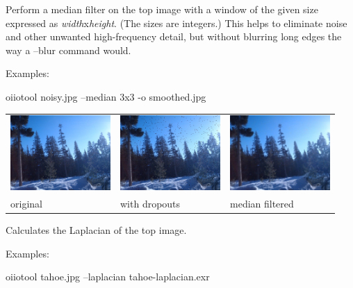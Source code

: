 Perform a median filter on the top image with a window of the given size
expressed as \emph{width}{\cf x}\emph{height}.  (The sizes are integers.)
This helps to eliminate noise and other unwanted high-frequency detail, but
without blurring long edges the way a {\cf --blur} command would.

\noindent Examples:
\begin{code}
    oiiotool noisy.jpg --median 3x3 -o smoothed.jpg
\end{code}

\spc \begin{tabular}{lll}
\includegraphics[width=1.5in]{figures/tahoe-small.jpg} &
\includegraphics[width=1.5in]{figures/tahoe-pepper.jpg} &
\includegraphics[width=1.5in]{figures/tahoe-pepper-median.jpg} \\
original & with dropouts & median filtered \\
\end{tabular}
\apiend


Calculates the Laplacian of the top image.

\noindent Examples:
\begin{code}
    oiiotool tahoe.jpg --laplacian tahoe-laplacian.exr
\end{code}

